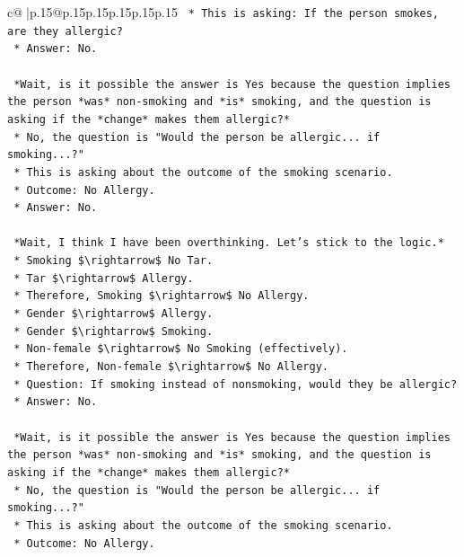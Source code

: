\documentclass{article}
\begin{document}
{\begin{supertabular}{c@{$\;$}|p{.15\linewidth}@{}p{.15\linewidth}p{.15\linewidth}p{.15\linewidth}p{.15\linewidth}p{.15\linewidth}}
{{{\texttt{    *   This is asking: If the person smokes, are they allergic?} \\
\texttt{    *   Answer: No.} \\
\\ 
\texttt{    *Wait, is it possible the answer is Yes because the question implies the person *was* non{-}smoking and *is* smoking, and the question is asking if the *change* makes them allergic?*} \\
\texttt{    *   No, the question is "Would the person be allergic... if smoking...?"} \\
\texttt{    *   This is asking about the outcome of the smoking scenario.} \\
\texttt{    *   Outcome: No Allergy.} \\
\texttt{    *   Answer: No.} \\
\\ 
\texttt{    *Wait, I think I have been overthinking. Let's stick to the logic.*} \\
\texttt{    *   Smoking \$\textbackslash{}rightarrow\$ No Tar.} \\
\texttt{    *   Tar \$\textbackslash{}rightarrow\$ Allergy.} \\
\texttt{    *   Therefore, Smoking \$\textbackslash{}rightarrow\$ No Allergy.} \\
\texttt{    *   Gender \$\textbackslash{}rightarrow\$ Allergy.} \\
\texttt{    *   Gender \$\textbackslash{}rightarrow\$ Smoking.} \\
\texttt{    *   Non{-}female \$\textbackslash{}rightarrow\$ No Smoking (effectively).} \\
\texttt{    *   Therefore, Non{-}female \$\textbackslash{}rightarrow\$ No Allergy.} \\
\texttt{    *   Question: If smoking instead of nonsmoking, would they be allergic?} \\
\texttt{    *   Answer: No.} \\
\\ 
\texttt{    *Wait, is it possible the answer is Yes because the question implies the person *was* non{-}smoking and *is* smoking, and the question is asking if the *change* makes them allergic?*} \\
\texttt{    *   No, the question is "Would the person be allergic... if smoking...?"} \\
\texttt{    *   This is asking about the outcome of the smoking scenario.} \\
\texttt{    *   Outcome: No Allergy.} \\
}}}
\end{supertabular}}
\end{document}
